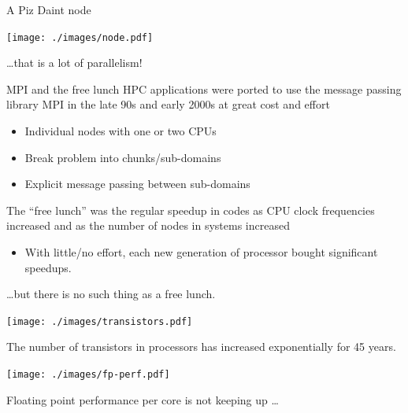 \documentclass[aspectratio=43]{beamer}
\begin{document}
\begin{frame}[fragile]{A Piz Daint node}
    \begin{center}
        \texttt{[image: ./images/node.pdf]}
    \end{center}
    \dots that is a lot of parallelism!
\end{frame}


\begin{frame}[fragile]{MPI and the free lunch}
    HPC applications were ported to use the message passing library MPI in the late 90s and early 2000s at great cost and effort
    \begin{itemize}
        \item Individual nodes with one or two CPUs
        \item Break problem into chunks/sub-domains
        \item Explicit message passing between sub-domains
    \end{itemize}
    The ``free lunch'' was the regular speedup in codes as CPU clock frequencies increased and as the number of nodes in systems increased
    \begin{itemize}
        \item With little/no effort, each new generation of processor bought significant speedups.
    \end{itemize}

    \dots  but there is no such thing as a free lunch.
\end{frame}

\begin{frame}[fragile]{}
    \begin{center}
        \texttt{[image: ./images/transistors.pdf]}

        The number of transistors in processors has increased exponentially for 45 years.
    \end{center}
\end{frame}

\begin{frame}[fragile]{}
    \begin{center}
        \texttt{[image: ./images/fp-perf.pdf]}

        Floating point performance per core is not keeping up \dots
    \end{center}
\end{frame}
\end{document}
